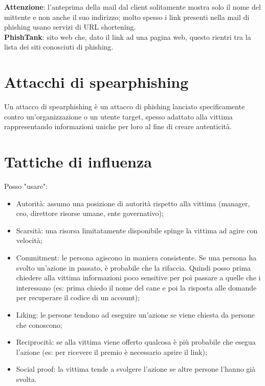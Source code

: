 \noindent \textbf{Attenzione}: l'anteprima della mail dal client solitamente mostra solo il nome del mittente e non anche il suo indirizzo; molto spesso i link presenti nella mail di phishing usano servizi di URL shortening.\\

\noindent \textbf{PhishTank}: sito web che, dato il link ad una pagina web, questo rientri tra la lista dei siti conosciuti di phishing.

\section{Attacchi di spearphishing}
Un attacco di spearphishing è un attacco di phishing lanciato specificamente contro un'organizzazione o un utente target, spesso adattato alla vittima rappresentando informazioni uniche per loro al fine di creare autenticità.

\section{Tattiche di influenza}
Posso "usare":
\begin{itemize}
    \item Autorità: assumo una posizione di autorità rispetto alla vittima (manager, ceo, direttore risorse umane, ente governativo);
    \item Scarsità: una risorsa limitatamente disponibile spinge la vittima ad agire con velocità;
    \item Commitment: le persona agiscono in maniera consistente. Se una persona ha svolto un'azione in passato, è probabile che la rifaccia. Quindi posso prima chiedere alla vittima informazioni poco sensitive per poi passare a quelle che  i interessano (es: prima chiedo il nome del cane e poi la risposta alle domande per recuperare il codice di un account);
    \item Liking: le persone tendono ad eseguire un'azione se viene chiesta da persone che conoscono;
    \item Reciprocità: se alla vittima viene offerto qualcosa è più probabile che esegua l'azione (es: per ricevere il premio è necessario aprire il link);
    \item Social proof: la vittima tende a svolgere l'azione se altre persone l'hanno già svolta.
\end{itemize}

